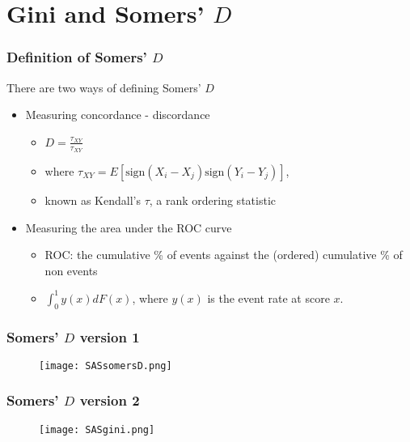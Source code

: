 \documentclass{beamer}
\begin{document}


\section{Gini and Somers' $D$}



\begin{frame}
\frametitle{Definition of Somers' $D$}

There are two ways of defining Somers' $D$
\begin{itemize}
    \item Measuring concordance - discordance
    \begin{itemize}
        \item $D = \frac{\tau_{XY}}{\tau_{XY}}$
        \item where $\tau_{XY} = E[\mathrm{sign}(X_i - X_j)\mathrm{sign}(Y_i - Y_j)]$,
        \item known as Kendall's $\tau$, a rank ordering statistic
    \end{itemize}
    \item Measuring the area under the ROC curve
    \begin{itemize}
        \item ROC: the cumulative \% of events against the (ordered) cumulative \% of non events
        \item $\int_{0}^{1} y(x) dF(x)$, where $y(x)$ is the event rate at score $x$.
    \end{itemize}
\end{itemize}

\end{frame}


\begin{frame}
\frametitle{Somers' $D$ version 1}

\begin{figure}
    \texttt{[image: SASsomersD.png]}
\end{figure}

\end{frame}



\begin{frame}
\frametitle{Somers' $D$ version 2}

\begin{figure}
    \texttt{[image: SASgini.png]}
\end{figure}

\end{frame}
\end{document}
